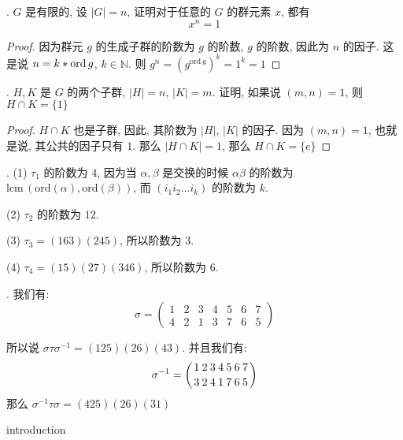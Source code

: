 \documentclass[12pt]{ctexart}
\theoremstyle{definition}
\theoremstyle{remark}
\begin{document}
. \(G\) 是有限的, 设 \(\vert G\vert  = n\), 证明对于任意的 \(G\) 的群元素 \(x\), 都有
\[
x ^{n} = 1
\]
\begin{proof}
	因为群元 \(g\) 的生成子群的阶数为 \(g\) 的阶数, \(g\) 的阶数, 因此为 \(n\) 的因子. 这是说 \(n = k * \hbox{ord}\, g\), 
	\(k \in \mathbb{N}\). 则 \(g ^{n} = (g ^{\text{ord}\, g})^{k} = 1 ^{k}  = 1\) 
\end{proof}

. \(H, K \) 是 \(G\) 的两个子群, \(\vert H \vert = n\), \(\vert K \vert = m\). 证明, 如果说 \( (m , n) = 1\), 则 \(H \cap K = \{1 \}\) 
\begin{proof}
\(H \cap K\) 也是子群, 因此, 其阶数为 \(\vert H \vert\), \(\vert K\vert\) 的因子. 因为 \( (m , n) = 1\), 也就是说, 其公共的因子只有 \(1\). 那么 \(\vert H \cap K \vert = 1\), 那么 \(H \cap K = \{e \}\)
\end{proof}



. (1) \(\tau _{1}\) 的阶数为 \(4\), 因为当 \(\alpha ,\beta \) 是交换的时候 \(\alpha\beta \) 的阶数为 \(  \text{lcm}\, (\text{ord}(\alpha ) , \text{ord}(\beta))\), 而 \( ( i _{1} i_2 \dots  i _{k})\) 的阶数为 \(k\).

(2) \(\tau_{2}\) 的阶数为 \(12\). 

(3) \(\tau _{3} = (163) (245)\), 所以阶数为 \(3\). 

(4)  \(\tau _{4} = (15) ( 27) (346)\), 所以阶数为 \(6\).


. 我们有: 
\[
\sigma = 
\begin{pmatrix}
 1 & 2 & 3& 4 & 5 & 6 & 7 \\ 
 4 & 2 & 1 & 3 & 7 & 6 & 5 
\end{pmatrix}
\]

所以说 \(\sigma \tau\sigma ^{-1} =  ( 125) (26) ( 43)\). 并且我们有: 
\[
\sigma ^{-1} = 
\left( 
	{ 1 \atop 3}
	{ 2 \atop 2}
	{ 3 \atop 4}
	{ 4 \atop 1}
	{ 5 \atop 7}
	{ 6 \atop 6}
	{ 7 \atop 5}
\right)
\]
那么 \(\sigma ^{-1}\tau\sigma =  ( 42 5) (26) ( 31)\)

\centerline{\large introduction} 
\end{document}
